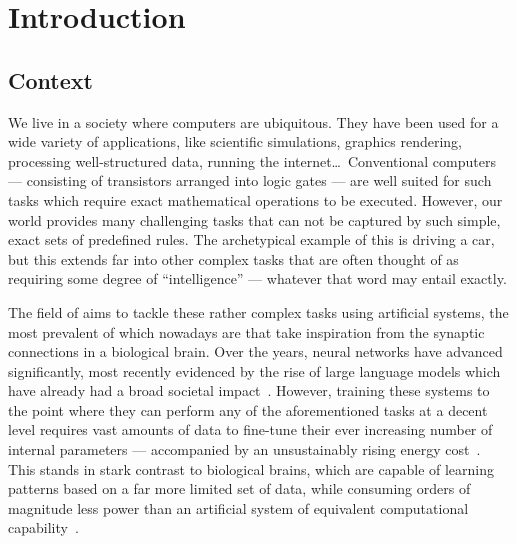 \chapter{Introduction}\label{ch:Introduction}


\section{Context}
We live in a society where computers are ubiquitous. %
They have been used for a wide variety of applications, like scientific simulations, graphics rendering, processing well-structured data, running the internet\dots\,
Conventional computers --- consisting of transistors arranged into logic gates --- are well suited for such tasks which require exact mathematical operations to be executed.
However, our world provides many challenging tasks that can not be captured by such simple, exact sets of predefined rules.
The archetypical example of this is driving a car, but this extends far into other complex tasks that are often thought of as requiring some degree of ``intelligence'' --- whatever that word may entail exactly. \par
The field of  aims to tackle these rather complex tasks using artificial systems, the most prevalent of which nowadays are  that take inspiration from the synaptic connections in a biological brain.
Over the years, neural networks have advanced significantly, most recently evidenced by the rise of large language models which have already had a broad societal impact~\cite{ImprovingLanguageGPT,GPT-4}.
However, training these systems to the point where they can perform any of the aforementioned tasks at a decent level requires vast amounts of data to fine-tune their ever increasing number of internal parameters --- accompanied by an unsustainably rising energy cost~\cite{QuantumNeuromorphicOpportunities,BLOOM_CarbonFootprint_176Bparam}.
This stands in stark contrast to biological brains, which are capable of learning patterns based on a far more limited set of data, while consuming orders of magnitude less power than an artificial system of equivalent computational capability~\cite{NeuromorphicSpintronics}.
